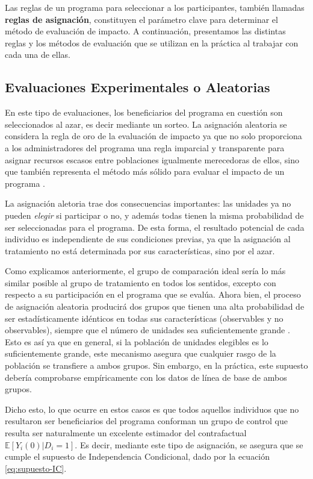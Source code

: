 \documentclass[../../main.tex]{subfiles}
\begin{document}
\bigskip
Las reglas de un programa para seleccionar a los participantes, también llamadas \textbf{reglas de asignación}, constituyen el parámetro clave para determinar el método de evaluación de impacto. A continuación, presentamos las distintas reglas y los métodos de evaluación que se utilizan en la práctica al trabajar con cada una de ellas.

\subsection{Evaluaciones Experimentales o Aleatorias}
En este tipo de evaluaciones, los beneficiarios del programa en cuestión son seleccionados al azar, es decir mediante un sorteo. La asignación aleatoria se considera la regla de oro de la evaluación de impacto ya que no solo proporciona a los administradores del programa una regla imparcial y transparente para asignar recursos escasos entre poblaciones igualmente merecedoras de ellos, sino que también representa el método más sólido para evaluar el impacto de un programa \cite{gertler-2016}.

La asignación aletoria trae dos consecuencias importantes: las unidades ya no pueden \textit{elegir} si participar o no, y además todas tienen la misma probabilidad de ser seleccionadas para el programa. De esta forma, el resultado potencial de cada individuo es independiente de sus condiciones previas, ya que la asignación al tratamiento no está determinada por sus características, sino por el azar.

Como explicamos anteriormente, el grupo de comparación ideal sería lo más similar posible al grupo de tratamiento en todos los sentidos, excepto con respecto a su participación en el programa que se evalúa. Ahora bien, el proceso de asignación aleatoria producirá dos grupos que tienen una alta probabilidad de ser estadísticamente idénticos en todas sus características (observables y no observables), siempre que el número de unidades sea suficientemente grande \cite{gertler-2016}. Esto es así ya que en general, si la población de unidades elegibles es lo suficientemente grande, este mecanismo asegura que cualquier rasgo de la población se transfiere a ambos grupos. Sin embargo, en la práctica, este supuesto debería comprobarse empíricamente con los datos de línea de base de ambos grupos.

Dicho esto, lo que ocurre en estos casos es que todos aquellos individuos que no resultaron ser beneficiarios del programa conforman un grupo de control que resulta ser naturalmente un excelente estimador del contrafactual \(\mathbb{E} \left[Y_i(0)|D_i=1\right]\). Es decir, mediante este tipo de asignación, se asegura que se cumple el supuesto de Independencia Condicional, dado por la ecuación \ref{eq:supuesto-IC}.
\end{document}
